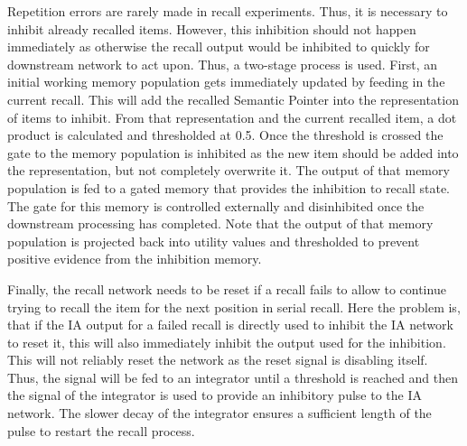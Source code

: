 Repetition errors are rarely made in recall experiments.
Thus, it is necessary to inhibit already recalled items.
However, this inhibition should not happen immediately as otherwise the recall output would be inhibited to quickly for downstream network to act upon.
Thus, a two-stage process is used.
First, an initial working memory population gets immediately updated by feeding in the current recall.
This will add the recalled Semantic Pointer into the representation of items to inhibit.
From that representation and the current recalled item, a dot product is calculated and thresholded at \num{0.5}.
Once the threshold is crossed the gate to the memory population is inhibited as the new item should be added into the representation, but not completely overwrite it.
The output of that memory population is fed to a gated memory that provides the inhibition to recall state.
The gate for this memory is controlled externally and disinhibited once the downstream processing has completed.
Note that the output of that memory population is projected back into utility values and thresholded to prevent positive evidence from the inhibition memory.

Finally, the recall network needs to be reset if a recall fails to allow to continue trying to recall the item for the next position in serial recall.
Here the problem is, that if the IA output for a failed recall is directly used to inhibit the IA network to reset it, this will also immediately inhibit the output used for the inhibition.
This will not reliably reset the network as the reset signal is disabling itself.
Thus, the signal will be fed to an integrator until a threshold is reached and then the signal of the integrator is used to provide an inhibitory pulse to the IA network.
The slower decay of the integrator ensures a sufficient length of the pulse to restart the recall process.

